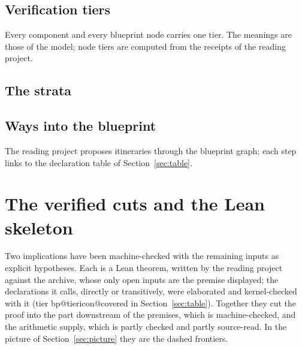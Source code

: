 \documentclass[11pt,a4paper,oneside]{article}
\makeatletter
\newcommand\bptiericon[1]{\csname bp@tiericon@#1\endcsname}
\newcommand\bptiericonplain[1]{\textcolor{tier-#1}{\bptiericon{#1}}}
\makeatother
\begin{document}
\subsection{Verification tiers}\label{sec:tiers}
Every component and every blueprint node carries one tier. The meanings are those of the model; node
tiers are computed from the receipts of the reading project.


\subsection{The \NumStrataWord{} strata}


\subsection{Ways into the blueprint}
The reading project proposes \NumItinerariesWord{} itineraries through the blueprint graph; each step links to the
declaration table of Section~\ref{sec:table}.


\clearpage
{}
\begin{landscape}
\thispagestyle{empty}
\label{sec:picture}%
%
\noindent\makebox[\linewidth][l]{}
\end{landscape}
\restoregeometry



\clearpage
\section{The verified cuts and the Lean skeleton}\label{sec:cuts}

Two implications have been machine-checked with the remaining inputs as explicit hypotheses. Each is a
Lean theorem, written by the reading project against the archive, whose only open inputs are the premise
displayed; the declarations it calls, directly or transitively, were elaborated and kernel-checked with
it (tier \bptiericonplain{covered} in Section~\ref{sec:table}). Together they cut the proof into the part
downstream of the premises, which is machine-checked, and the arithmetic supply, which is partly checked
and partly source-read. In the picture of Section~\ref{sec:picture} they are the dashed frontiers.

\end{document}

